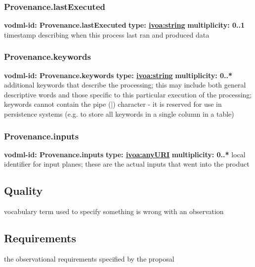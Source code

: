     \subsubsection{Provenance.lastExecuted}
      \textbf{vodml-id: Provenance.lastExecuted} \newline
      \textbf{type: \hyperref[sect:ivoa]{ivoa:string}} \newline
      \textbf{multiplicity: 0..1} \newline
      timestamp describing when this process last ran and produced data

    \subsubsection{Provenance.keywords}
      \textbf{vodml-id: Provenance.keywords} \newline
      \textbf{type: \hyperref[sect:ivoa]{ivoa:string}} \newline
      \textbf{multiplicity: 0..*} \newline
      additional keywords that describe the processing; this may include both general descriptive words and those specific to this particular execution of the processing; keywords cannot contain the pipe (|) character - it is reserved for use in persistence systems (e.g. to store all keywords in a single column in a table)

    \subsubsection{Provenance.inputs}
      \textbf{vodml-id: Provenance.inputs} \newline
      \textbf{type: \hyperref[sect:ivoa]{ivoa:anyURI}} \newline
      \textbf{multiplicity: 0..*} \newline
      local identifier for input planes; these are the actual inputs that went into the product

  \subsection{Quality}
  \label{sect:Quality}
    vocabulary term used to specify something is wrong with an observation

  \subsection{Requirements}
  \label{sect:Requirements}
    the observational requirements specified by the proposal

